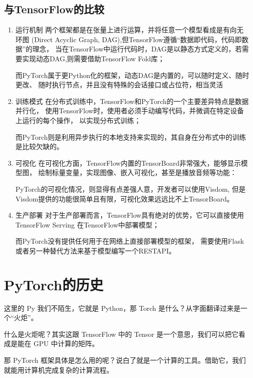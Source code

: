 \subsection{与TensorFlow的比较}
\begin{enumerate}[label=\arabic*)]
    \item 运行机制
    两个框架都是在张量上进行运算，并将任意一个模型看成是有向无环图
    (Direct Acyclic Graph, DAG),但TensorFlow遵循“数据即代码，代码即数据”的理念，
    当在TensorFlow中运行代码时，DAG是以静态方式定义的，若需要实现动态DAG,则需要借助TensorFlow Fold库；
    
    而PyTorch属于更Python化的框架，动态DAG是内置的，可以随时定义、随时更改、
    随时执行节点，并且没有特殊的会话接口或占位符，相当灵活

    \item 训练模式
    在分布式训练中，TensorFlow和PyTorch的一个主要差异特点是数据并行化，
    使用TensorFlow时，使用者必须手动编写代码，并微调在特定设备上运行的每个操作，
    以实现分布式训练；
    
    而PyTorch则是利用异步执行的本地支持来实现的，其自身在分布式中的训练是比较欠缺的。

    \item 可视化
    在可视化方面，TensorFlow内置的TensorBoard非常强大，能够显示模型图，
    绘制标量变量，实现图像、嵌入可视化，甚至是播放音频等功能：
    
    PyTorch的可视化情况，则显得有点差强人意，开发者可以使用Visdom,
    但是Visdom提供的功能很简单且有限，可视化效果远远比不上TensorBoard。

    \item 生产部署
    对于生产部署而言，TensorFlow具有绝对的优势，它可以直接使用TensorFlow Serving 在TensorFlow中部署模型；
    
    而PyTorch没有提供任何用于在网络上直接部署模型的框架， 需要使用Flask或者另一种替代方法来基于模型编写一个RESTAPI。
\end{enumerate}


\section{PyTorch的历史}
这里的 Py 我们不陌生，它就是 Python，那 Torch 是什么？从字面翻译过来是一个“火炬”。

什么是火炬呢？其实这跟 TensorFlow 中的 Tensor 是一个意思，我们可以把它看成是能在 GPU 中计算的矩阵。

那 PyTorch 框架具体是怎么用的呢？说白了就是一个计算的工具。借助它，我们就能用计算机完成复杂的计算流程。

